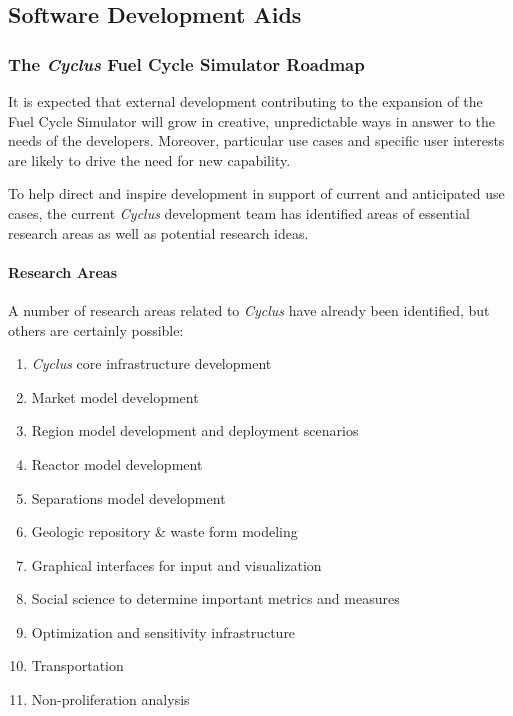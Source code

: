 \documentclass[letterpaper,10pt,english]{sphinxmanual}
\begin{document}
\subsection{Software Development Aids}
\label{devdoc/main:software-development-aids}

\subsubsection{The \emph{Cyclus} Fuel Cycle Simulator Roadmap}
\label{basics/roadmap:the-cyclus-fuel-cycle-simulator-roadmap}\label{basics/roadmap::doc}
It is expected that external development contributing to the expansion
of the Fuel Cycle Simulator will grow in creative, unpredictable ways
in answer to the needs of the developers.  Moreover, particular use
cases and specific user interests are likely to drive the need for new
capability.

To help direct and inspire development in support of current and anticipated
use cases, the current \emph{Cyclus} development team has identified areas of
essential research areas as well as potential research ideas.


\paragraph{Research Areas}
\label{basics/roadmap:research-areas}
A number of research areas related to \emph{Cyclus} have already been
identified, but others are certainly possible:
\begin{enumerate}
\item {} 
\emph{Cyclus} core infrastructure development

\item {} 
Market model development

\item {} 
Region model development and deployment scenarios

\item {} 
Reactor model development

\item {} 
Separations model development

\item {} 
Geologic repository \& waste form modeling

\item {} 
Graphical interfaces for input and visualization

\item {} 
Social science to determine important metrics and measures

\item {} 
Optimization and sensitivity infrastructure

\item {} 
Transportation

\item {} 
Non-proliferation analysis

\end{enumerate}
\end{document}
